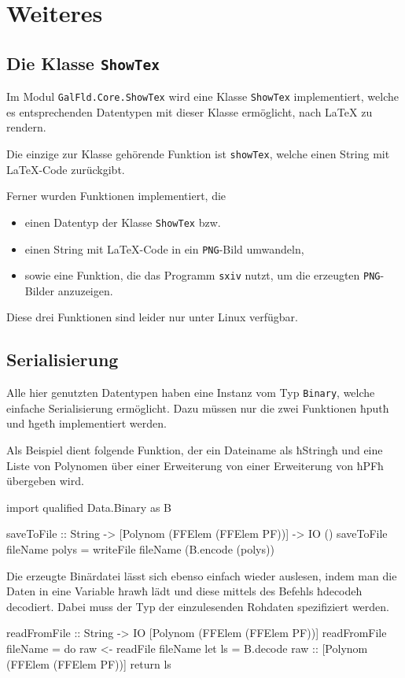\section{Weiteres}
\subsection{Die Klasse \texttt{ShowTex}}
Im Modul \texttt{GalFld.Core.ShowTex} wird eine Klasse \texttt{ShowTex}
implementiert, welche es entsprechenden Datentypen mit dieser Klasse
ermöglicht, nach \LaTeX{} zu rendern.

Die einzige zur Klasse gehörende Funktion ist \texttt{showTex}, welche einen
String mit \LaTeX{}-Code zurückgibt.

Ferner wurden Funktionen implementiert, die 
\begin{itemize}
  \item einen Datentyp der Klasse \texttt{ShowTex} bzw.
  \item einen String mit \LaTeX{}-Code in ein \texttt{PNG}-Bild umwandeln,
  \item sowie eine Funktion, die das Programm \texttt{sxiv} nutzt, 
    um die erzeugten \texttt{PNG}-Bilder anzuzeigen.
\end{itemize}
Diese drei Funktionen sind leider nur unter Linux verfügbar.


\subsection{Serialisierung}
Alle hier genutzten Datentypen haben eine Instanz vom Typ \texttt{Binary},
welche einfache Serialisierung ermöglicht. Dazu müssen nur die zwei Funktionen
ħputħ und ħgetħ implementiert werden.

Als Beispiel dient folgende Funktion, der ein Dateiname als
ħStringħ und eine Liste von Polynomen über einer Erweiterung von
einer Erweiterung von ħPFħ übergeben wird.
\begin{hcode}
import qualified Data.Binary as B

saveToFile :: String -> [Polynom (FFElem (FFElem PF))] -> IO ()
saveToFile fileName polys = writeFile fileName (B.encode (polys))
\end{hcode}

Die erzeugte Binärdatei lässt sich ebenso einfach wieder auslesen, 
indem man die
Daten in eine Variable ħrawħ lädt und diese mittels des Befehls
ħdecodeħ decodiert. Dabei muss der Typ der einzulesenden Rohdaten spezifiziert
werden.
\begin{hcode}
readFromFile :: String -> IO [Polynom (FFElem (FFElem PF))]
readFromFile fileName = do
  raw <- readFile fileName
  let ls = B.decode raw :: [Polynom (FFElem (FFElem PF))]
  return ls
\end{hcode}

